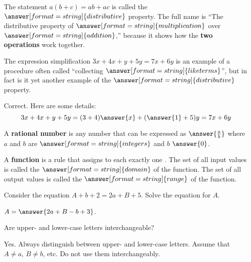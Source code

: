 \documentclass[nooutcomes]{ximera}
\begin{document}
\begin{problem}
The statement $a(b+c)=ab+ac$ is called the $\answer[format=string]{distributive}$ property.  The full name is ``The distributive property of $\answer[format=string]{multiplication}$ over $\answer[format=string]{addition}$,'' because it shows how the \textbf{two operations} work together. 
\end{problem}

\begin{problem}
The expression simplification $3x+4x+y+5y=7x+6y$ is an example of a procedure often called ``collecting 
$\answer[format=string]{like terms}$'', but in fact is it yet another example of the 
$\answer[format=string]{distributive}$ property. 
\begin{problem}
Correct.  Here are some details: 
\[
3x+4x+y+5y=(3+4)\answer{x}+(\answer{1}+5)y=7x+6y
\]
\end{problem}

\begin{problem}
A \textbf{rational number} is any number that can be expressed as $\answer{\frac{a}{b}}$ where $a$ and $b$ are $\answer[format=string]{integers}$ and $b$ \wordChoice{\choice{$=$} \choice{$<$} \choice{$>$} \choice[correct]{$\ne$}} $\answer{0}$.
\end{problem}
\end{problem}

\begin{problem}
A \textbf{function} is a rule that assigns to each 
 exactly one .  The set of 
all input values is called the $\answer[format=string]{domain}$ of the function.  The set of 
all output values is called the $\answer[format=string]{range}$ of the function.
\end{problem}

\begin{problem}
Consider the equation $A+b+2=2a+B+5$.  Solve the equation for $A$.  

$A=\answer{2a+B-b+3}$.  
\begin{hint}
Are upper- and lower-case letters interchangeable?  
\end{hint}
\begin{feedback}[correct]
Yes.  Always distinguish between upper- and lower-case letters.  Assume that $A\ne a$, $B\ne b$, etc.  Do not use them interchangeably.  
\end{feedback}
\end{problem}
\end{document}
